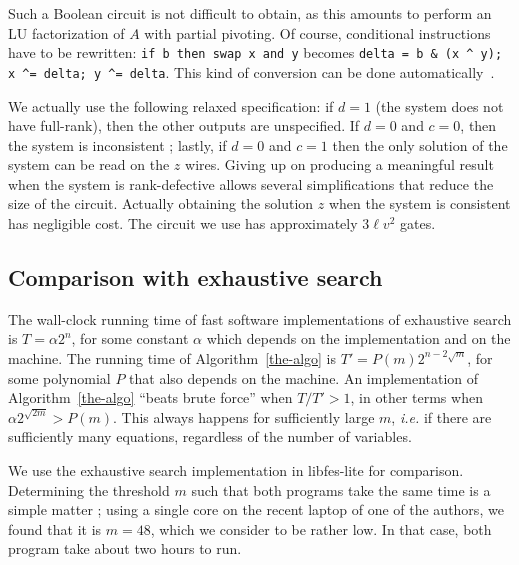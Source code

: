 \documentclass[twoside,leqno]{article}
\begin{document}
Such a Boolean circuit is not difficult to obtain, as this amounts to perform an
LU factorization of $A$ with partial pivoting. Of course, conditional
instructions have to be rewritten: \texttt{if b then swap x and y} becomes
\verb|delta = b & (x ^ y); x ^= delta; y ^= delta|. This kind of
conversion can be done automatically~\cite{ElmasryK12}.

We actually use the following relaxed specification: if $d=1$ (the system does
not have full-rank), then the other outputs are unspecified. If $d=0$ and $c=0$,
then the system is inconsistent ; lastly, if $d=0$ and $c=1$ then the only
solution of the system can be read on the $z$ wires. Giving up on producing a
meaningful result when the system is rank-defective allows several
simplifications that reduce the size of the circuit. Actually obtaining the
solution $z$ when the system is consistent has negligible cost. The circuit we
use has approximately $3\ell v^2$ gates.

\subsection{Comparison with exhaustive search}

The wall-clock running time of fast software implementations of exhaustive
search is $T = \alpha 2^n$, for some constant $\alpha$ which depends on the
implementation and on the machine. The running time of Algorithm~\ref{the-algo}
is $T' = P(m) 2^{n - 2\sqrt{m}}$, for some polynomial $P$ that also depends on
the machine. An implementation of Algorithm~\ref{the-algo} ``beats brute force''
when $T/T' > 1$, in other terms when $\alpha 2^{\sqrt{2m}} > P(m)$. This always
happens for sufficiently large $m$, \textit{i.e.} if there are sufficiently many
equations, regardless of the number of variables.

We use the exhaustive search implementation in \textsf{libfes-lite} for
comparison. Determining the threshold $m$ such that both programs take the same
time is a simple matter ; using a single core on the recent laptop of one of the
authors, we found that it is $m=48$, which we consider to be rather low. In that
case, both program take about two hours to run.

\end{document}
